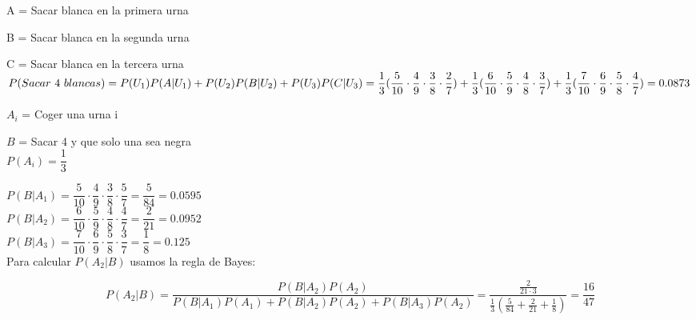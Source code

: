 \subproblem
A = Sacar blanca en la primera urna

B = Sacar blanca en la segunda urna

C = Sacar blanca en la tercera urna \\


$P(Sacar\ 4 \ blancas) = P(U_1)P(A|U_1) + P(U_2)P(B|U_2) + P(U_3)P(C|U_3) =  \\
\dfrac{1}{3}(\dfrac{5}{10}\cdot\dfrac{4}{9}\cdot\dfrac{3}{8}\cdot\dfrac{2}{7}) + 
  \dfrac{1}{3}(\dfrac{6}{10}\cdot\dfrac{5}{9}\cdot\dfrac{4}{8}\cdot\dfrac{3}{7}) + 
  \dfrac{1}{3}(\dfrac{7}{10}\cdot\dfrac{6}{9}\cdot\dfrac{5}{8}\cdot\dfrac{4}{7}) = 0.0873$ \\

\subproblem

$A_i$ = Coger una urna i 

$B$ = Sacar 4 y que solo una sea negra \\

$P(A_i) = \dfrac{1}{3}$

$P(B|A_1) = \dfrac{5}{10} \cdot \dfrac{4}{9} \cdot \dfrac{3}{8} \cdot \dfrac{5}{7} = \dfrac{5}{84} = 0.0595$ \\

$P(B|A_2) = \dfrac{6}{10} \cdot \dfrac{5}{9} \cdot \dfrac{4}{8} \cdot \dfrac{4}{7} = \dfrac{2}{21} = 0.0952$ \\

$P(B|A_3) = \dfrac{7}{10} \cdot \dfrac{6}{9} \cdot \dfrac{5}{8} \cdot \dfrac{3}{7} = \dfrac{1}{8} = 0.125$ \\


Para calcular $P(A_2|B)$ usamos la regla de Bayes:

$$ P(A_2|B) = \dfrac{P(B|A_2)P(A_2)}{P(B|A_1)P(A_1)+P(B|A_2)P(A_2)+P(B|A_3)P(A_2)} = \dfrac{\frac{2}{21 \cdot 3}}{\frac{1}{3}(\frac{5}{84} + \frac{2}{21} + \frac{1}{8})} = \dfrac{16}{47}$$
